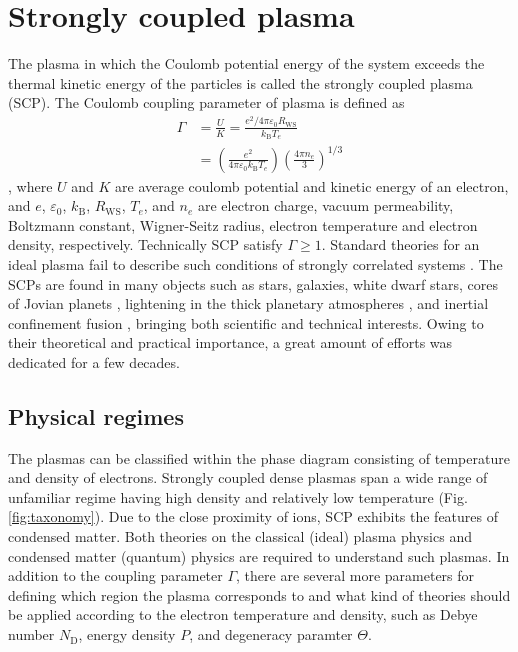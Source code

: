 
\chapter{Strongly coupled plasma}
\label{sec:ch3}

The plasma in which the Coulomb potential energy of the system exceeds the thermal kinetic energy of the particles is called the strongly coupled plasma (SCP). The Coulomb coupling parameter of plasma is defined as
\begin{equation}
\begin{aligned}
\Gamma &= \frac{U}{K}=\frac{e^{2} / 4 \pi \varepsilon_{0} R_\text{WS}}{k_\text{B} T_{e}} \\
&=\left(\frac{e^{2}}{4 \pi \varepsilon_{0} k_\text{B} T_{e}}\right)\left(\frac{4 \pi n_{e}}{3}\right)^{1 / 3}
\end{aligned}
\end{equation}
, where $U$ and $K$ are average coulomb potential and kinetic energy of an electron, and $e$, $\varepsilon_0$, $k_\text{B}$, $R_\text{WS}$, $T_e$, and $n_e$ are electron charge, vacuum permeability, Boltzmann constant, Wigner-Seitz radius, electron temperature and electron density, respectively. Technically SCP satisfy $\Gamma \geq 1$. Standard theories for an ideal plasma fail to describe such conditions of strongly correlated systems \cite{stanton2016ionic}. The SCPs are found in many objects such as stars, galaxies, white dwarf stars, cores of Jovian planets \cite{ichimaru1982strongly}, lightening in the thick planetary atmospheres \cite{cartier2020planetary}, and inertial confinement fusion \cite{remington2006experimental}, bringing both scientific and technical interests. Owing to their theoretical and practical importance, a great amount of efforts was dedicated for a few decades.



\section{Physical regimes}
\label{sec:ch3-1}

The plasmas can be classified within the phase diagram consisting of temperature and density of electrons. Strongly coupled dense plasmas span a wide range of unfamiliar regime having high density and relatively low temperature (Fig.\ref{fig:taxonomy}). Due to the close proximity of ions, SCP exhibits the features of condensed matter. Both theories on the classical (ideal) plasma physics and condensed matter (quantum) physics are required to understand such plasmas. In addition to the coupling parameter $\Gamma$, there are several more parameters for defining which region the plasma corresponds to and what kind of theories should be applied according to the electron temperature and density, such as Debye number $N_\text{D}$, energy density $P$, and degeneracy paramter $\Theta$.

